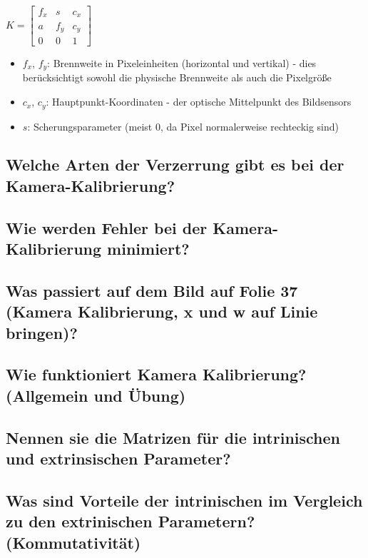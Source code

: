 \begin{minipage}{0.2\linewidth}
  $
  K = 
  \begin{bmatrix}
  f_x & s & c_x\\
  a & f_y & c_y\\
  0 & 0 & 1
  \end{bmatrix}
  $
\end{minipage}
\begin{minipage}{0.8\linewidth}
  \begin{itemize}
    \item $f_x$, $f_y$: Brennweite in Pixeleinheiten (horizontal und vertikal) - dies berücksichtigt sowohl die physische Brennweite als auch die Pixelgröße
    \item $c_x$, $c_y$: Hauptpunkt-Koordinaten - der optische Mittelpunkt des Bildsensors
    \item $s$: Scherungsparameter (meist 0, da Pixel normalerweise rechteckig sind)
  \end{itemize}
\end{minipage}

\subsection{Welche Arten der Verzerrung gibt es bei der Kamera-Kalibrierung?}

\subsection{Wie werden Fehler bei der Kamera-Kalibrierung minimiert?}

\subsection{Was passiert auf dem Bild auf Folie 37 (Kamera Kalibrierung, x und w auf Linie bringen)?}

\subsection{Wie funktioniert Kamera Kalibrierung? (Allgemein und Übung)}

\subsection{Nennen sie die Matrizen für die intrinischen und extrinsischen Parameter?}

\subsection{Was sind Vorteile der intrinischen im Vergleich zu den extrinischen Parametern? (Kommutativität)}

